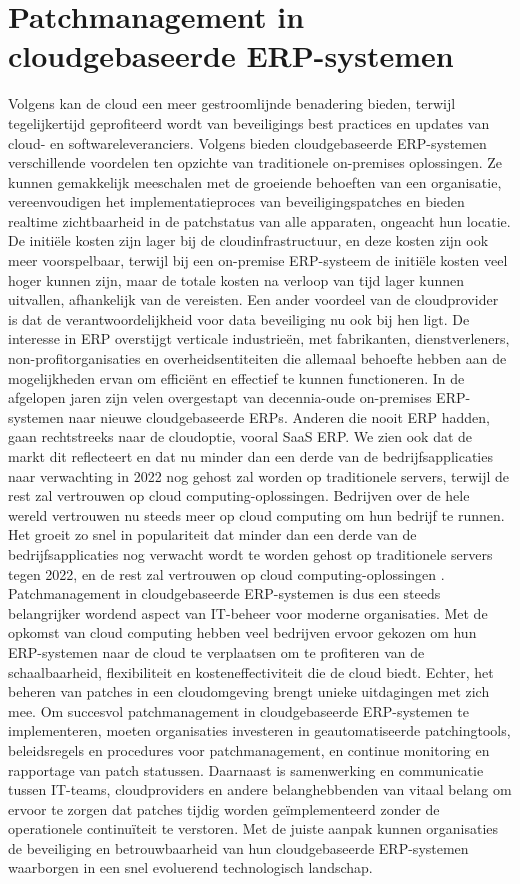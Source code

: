 \section{Patchmanagement in cloudgebaseerde ERP-systemen}
Volgens \textcite{Forbes2021} kan de cloud een meer gestroomlijnde benadering bieden, terwijl tegelijkertijd geprofiteerd wordt van beveiligings best practices en updates van cloud- en softwareleveranciers. Volgens \textcite{Cox2020} bieden cloudgebaseerde ERP-systemen verschillende voordelen  ten opzichte van traditionele on-premises oplossingen. Ze kunnen gemakkelijk meeschalen met de groeiende behoeften van een organisatie, vereenvoudigen het implementatieproces van beveiligingspatches en bieden realtime zichtbaarheid in de patchstatus van alle apparaten, ongeacht hun locatie. De initiële kosten zijn lager bij de cloudinfrastructuur, en deze kosten zijn ook meer voorspelbaar, terwijl bij een on-premise ERP-systeem de initiële kosten veel hoger kunnen zijn, maar de totale kosten na verloop van tijd lager kunnen uitvallen, afhankelijk van de vereisten. Een ander voordeel van de cloudprovider is dat de verantwoordelijkheid voor data beveiliging nu ook bij hen ligt.
De interesse in ERP overstijgt verticale industrieën, met fabrikanten, dienstverleners, non-profitorganisaties en overheidsentiteiten die allemaal behoefte hebben aan de mogelijkheden ervan om efficiënt en effectief te kunnen functioneren. In de afgelopen jaren zijn velen overgestapt van decennia-oude on-premises ERP-systemen naar nieuwe cloudgebaseerde ERPs. Anderen die nooit ERP hadden, gaan rechtstreeks naar de cloudoptie, vooral SaaS ERP.
We zien ook dat de markt dit reflecteert en dat nu minder dan een derde van de bedrijfsapplicaties naar verwachting in 2022 nog gehost zal worden op traditionele servers, terwijl de rest zal vertrouwen op cloud computing-oplossingen. Bedrijven over de hele wereld vertrouwen nu steeds meer op cloud computing om hun bedrijf te runnen. Het groeit zo snel in populariteit dat minder dan een derde van de bedrijfsapplicaties nog verwacht wordt te worden gehost op traditionele servers tegen 2022, en de rest zal vertrouwen op cloud computing-oplossingen \autocite{Pimentel2017}.
Patchmanagement in cloudgebaseerde ERP-systemen is dus een steeds belangrijker wordend aspect van IT-beheer voor moderne organisaties. Met de opkomst van cloud computing hebben veel bedrijven ervoor gekozen om hun ERP-systemen naar de cloud te verplaatsen om te profiteren van de schaalbaarheid, flexibiliteit en kosteneffectiviteit die de cloud biedt. Echter, het beheren van patches in een cloudomgeving brengt unieke uitdagingen met zich mee.
Om succesvol patchmanagement in cloudgebaseerde ERP-systemen te implementeren, moeten organisaties investeren in geautomatiseerde patchingtools, beleidsregels en procedures voor patchmanagement, en continue monitoring en rapportage van patch statussen. Daarnaast is samenwerking en communicatie tussen IT-teams, cloudproviders en andere belanghebbenden van vitaal belang om ervoor te zorgen dat patches tijdig worden geïmplementeerd zonder de operationele continuïteit te verstoren. Met de juiste aanpak kunnen organisaties de beveiliging en betrouwbaarheid van hun cloudgebaseerde ERP-systemen waarborgen in een snel evoluerend technologisch landschap.

